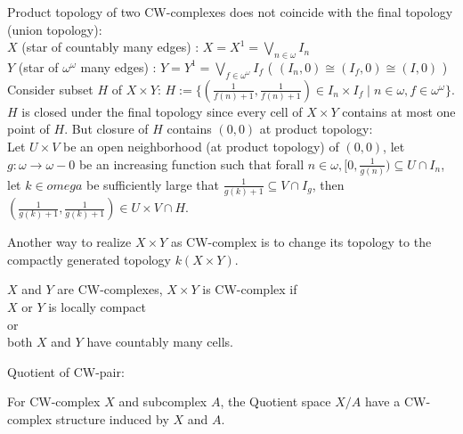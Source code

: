     \begin{exmp}
        Product topology of two CW-complexes does not coincide with the final topology (union topology):\\
        $X$ (star of countably many edges) :
        $X = X^1 = \bigvee_{n\in \omega} I_n $\\
        $Y$ (star of $\omega^{\omega}$ many edges) :
        $Y = Y^1 = \bigvee_{f \in \omega^{\omega}} I_f $
        ( $(I_n,0) \cong (I_f,0) \cong (I,0) $ )\\
        Consider subset $H$ of $X \times Y$:
        $H := \{ (\frac{1}{f(n)+1} , \frac{1}{f(n)+1}) \in I_n \times I_f \mid n \in \omega, f \in \omega^{\omega} \}$.\\
        $H$ is closed under the final topology
        since every cell of $X \times Y$ contains at most one point of $H$.
        But closure of $H$ contains $(0,0)$ at product topology:\\
        Let $U \times V$ be an open neighborhood (at product topology) of $(0,0)$,
        let $g : \omega \to \omega - 0$ be an increasing function such that
        forall $n \in \omega, [0,\frac{1}{g(n)}) \subseteq U \cap I_n$,
        let $k \in omega$ be sufficiently large that $\frac{1}{g(k)+1} \subseteq V \cap I_g$,
        then $(\frac{1}{g(k)+1} , \frac{1}{g(k)+1}) \in U \times V \cap H$.

    \end{exmp}

    \begin{note}
        Another way to realize $X \times Y$ as CW-complex
        is to change its topology to the compactly generated topology $k(X \times Y)$.
    \end{note}

    \begin{prop}
        $X$ and $Y$ are CW-complexes, $X \times Y$ is CW-complex if\\
        $X$ or $Y$ is locally compact\\
        or\\
        both $X$ and $Y$ have countably many cells.
    \end{prop}

    Quotient of CW-pair:

    \begin{prop}
        For CW-complex $X$ and subcomplex $A$, the Quotient space $X/A$ 
        have a CW-complex structure induced by $X$ and $A$.
    \end{prop}

